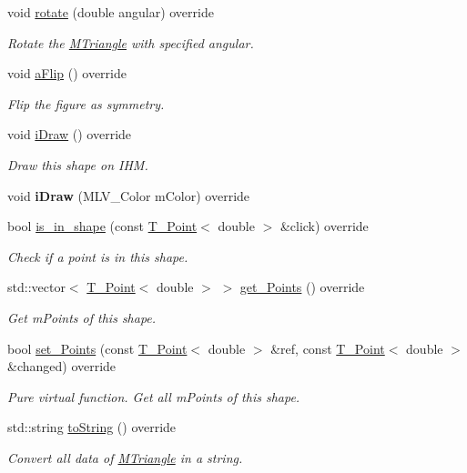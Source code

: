 \begin{DoxyCompactItemize}
void \hyperlink{classMTriangle_a4be29553eeddf99c367b1ec220bc102b}{rotate} (double angular) override
\begin{DoxyCompactList}\small\item\em Rotate the \hyperlink{classMTriangle}{M\+Triangle} with specified angular. \end{DoxyCompactList}\item 
\mbox{\label{classMTriangle_a6258b96b57c1892098f84a5a5fa0f976}} 
void \hyperlink{classMTriangle_a6258b96b57c1892098f84a5a5fa0f976}{aFlip} () override
\begin{DoxyCompactList}\small\item\em Flip the figure as symmetry. \end{DoxyCompactList}\item 
\mbox{\label{classMTriangle_a7801818e2188f39ba89a2a82df8fa5fe}} 
void \hyperlink{classMTriangle_a7801818e2188f39ba89a2a82df8fa5fe}{iDraw} () override
\begin{DoxyCompactList}\small\item\em Draw this shape on I\+HM. \end{DoxyCompactList}\item 
\mbox{\label{classMTriangle_a1f6a50eeb5a39e20c97d749bf37cd8ed}} 
void {\bfseries iDraw} (M\+L\+V\+\_\+\+Color mColor) override
\item 
bool \hyperlink{classMTriangle_a4cc4cd63537ead67a0b68d1ab25111b4}{is\+\_\+in\+\_\+shape} (const \hyperlink{classPoint}{T_Point}$<$ double $>$ \&click) override
\begin{DoxyCompactList}\small\item\em Check if a point is in this shape. \end{DoxyCompactList}\item 
std\+::vector$<$ \hyperlink{classPoint}{T_Point}$<$ double $>$ $>$ \hyperlink{classMTriangle_a90351a097a20d35f9d6c4d05ad881e48}{get\+\_\+\+Points} () override
\begin{DoxyCompactList}\small\item\em Get mPoints of this shape. \end{DoxyCompactList}\item
bool \hyperlink{classMTriangle_aec40d088d077bfb14f94895be871dfdf}{set\+\_\+\+Points} (const \hyperlink{classPoint}{T_Point}$<$ double $>$ \&ref, const \hyperlink{classPoint}{T_Point}$<$ double $>$ \&changed) override
\begin{DoxyCompactList}\small\item\em Pure virtual function. Get all mPoints of this shape. \end{DoxyCompactList}\item
std\+::string \hyperlink{classMTriangle_a7d1fd825592dffa6ac05b3398a8c105a}{to\+String} () override
\begin{DoxyCompactList}\small\item\em Convert all data of \hyperlink{classMTriangle}{M\+Triangle} in a string. \end{DoxyCompactList}\end{DoxyCompactItemize}
